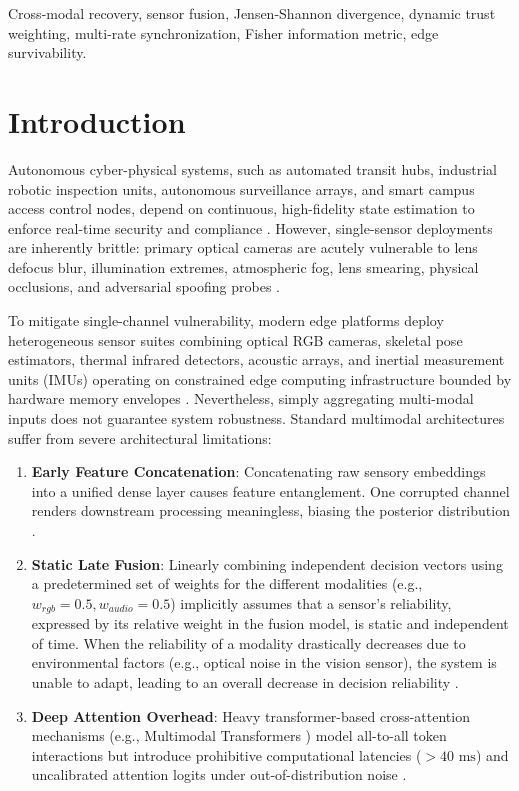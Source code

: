 \documentclass[conference]{IEEEtran}
\begin{document}
\begin{IEEEkeywords}
Cross-modal recovery, sensor fusion, Jensen-Shannon divergence, dynamic trust weighting, multi-rate synchronization, Fisher information metric, edge survivability.
\end{IEEEkeywords}

\section{Introduction}
Autonomous cyber-physical systems, such as automated transit hubs, industrial robotic inspection units, autonomous surveillance arrays, and smart campus access control nodes, depend on continuous, high-fidelity state estimation to enforce real-time security and compliance \cite{baltrusaitis2018multimodal, ramachandram2017deep}. However, single-sensor deployments are inherently brittle: primary optical cameras are acutely vulnerable to lens defocus blur, illumination extremes, atmospheric fog, lens smearing, physical occlusions, and adversarial spoofing probes \cite{dodge2016understanding, hendrycks2019benchmarking}.

To mitigate single-channel vulnerability, modern edge platforms deploy heterogeneous sensor suites combining optical RGB cameras, skeletal pose estimators, thermal infrared detectors, acoustic arrays, and inertial measurement units (IMUs) \cite{khaleghi2013multisensor} operating on constrained edge computing infrastructure \cite{shi2016edge, zhou2019edge} bounded by hardware memory envelopes \cite{narendra2026mbeee}. Nevertheless, simply aggregating multi-modal inputs does not guarantee system robustness. Standard multimodal architectures suffer from severe architectural limitations:
\begin{enumerate}
    \item \textbf{Early Feature Concatenation}: Concatenating raw sensory embeddings into a unified dense layer causes feature entanglement. One corrupted channel renders downstream processing meaningless, biasing the posterior distribution \cite{baltrusaitis2018multimodal}.
    \item \textbf{Static Late Fusion}: Linearly combining independent decision vectors using a predetermined set of weights for the different modalities (e.g., $w_{rgb} = 0.5, w_{audio} = 0.5$) implicitly assumes that a sensor's reliability, expressed by its relative weight in the fusion model, is static and independent of time. When the reliability of a modality drastically decreases due to environmental factors (e.g., optical noise in the vision sensor), the system is unable to adapt, leading to an overall decrease in decision reliability \cite{tsai2019multimodal}.
    \item \textbf{Deep Attention Overhead}: Heavy transformer-based cross-attention mechanisms (e.g., Multimodal Transformers \cite{tsai2019multimodal}) model all-to-all token interactions but introduce prohibitive computational latencies ($>40\text{ ms}$) and uncalibrated attention logits under out-of-distribution noise \cite{guo2017calibration}.
\end{enumerate}
\end{document}

